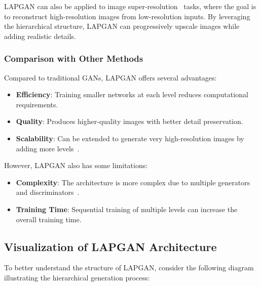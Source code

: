 LAPGAN can also be applied to image super-resolution~\cite{lai2018fast} tasks, where the goal is to reconstruct high-resolution images from low-resolution inputs. By leveraging the hierarchical structure, LAPGAN can progressively upscale images while adding realistic details.

\subsubsection{Comparison with Other Methods}

Compared to traditional GANs, LAPGAN offers several advantages:

\begin{itemize}
    \item \textbf{Efficiency}: Training smaller networks at each level reduces computational requirements.
    \item \textbf{Quality}: Produces higher-quality images with better detail preservation.
    \item \textbf{Scalability}: Can be extended to generate very high-resolution images by adding more levels~\cite{lai2018fast}.
\end{itemize}

However, LAPGAN also has some limitations:

\begin{itemize}
    \item \textbf{Complexity}: The architecture is more complex due to multiple generators and discriminators~\cite{denton2015deep}.
    \item \textbf{Training Time}: Sequential training of multiple levels can increase the overall training time.
\end{itemize}

\subsection{Visualization of LAPGAN Architecture}

To better understand the structure of LAPGAN, consider the following diagram illustrating the hierarchical generation process:


